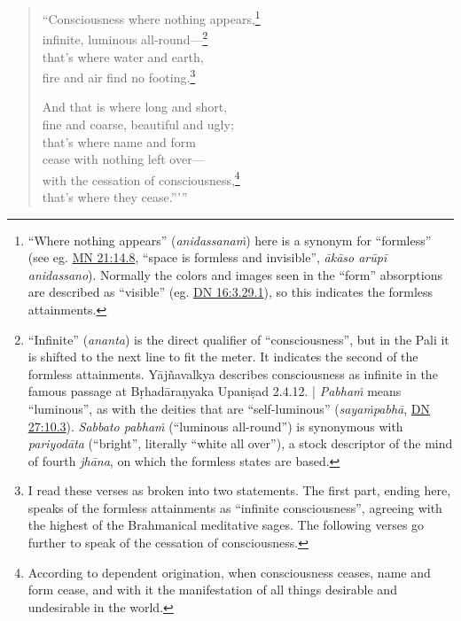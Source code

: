 \documentclass[12pt,openany]{book}%
\begin{document}
\begin{verse}%
“Consciousness where nothing appears,\footnote{“Where nothing appears” (\textit{\textsanskrit{anidassanaṁ}}) here is a synonym for “formless” (see eg. \href{https://suttacentral.net/mn21/en/sujato\#14.8}{MN 21:14.8}, “space is formless and invisible”, \textit{\textsanskrit{ākāso} \textsanskrit{arūpī} anidassano}). Normally the colors and images seen in the “form” absorptions are described as “visible” (eg. \href{https://suttacentral.net/dn16/en/sujato\#3.29.1}{DN 16:3.29.1}), so this indicates the formless attainments. } \\
infinite, luminous all-round—\footnote{“Infinite” (\textit{ananta}) is the direct qualifier of “consciousness”, but in the Pali it is shifted to the next line to fit the meter. It indicates the second of the formless attainments. \textsanskrit{Yājñavalkya} describes consciousness as infinite in the famous passage at \textsanskrit{Bṛhadāraṇyaka} \textsanskrit{Upaniṣad} 2.4.12. | \textit{\textsanskrit{Pabhaṁ}} means “luminous”, as with the deities that are “self-luminous” (\textit{\textsanskrit{sayaṁpabhā}}, \href{https://suttacentral.net/dn27/en/sujato\#10.3}{DN 27:10.3}). \textit{Sabbato \textsanskrit{pabhaṁ}} (“luminous all-round”) is synonymous with \textit{\textsanskrit{pariyodāta}} (“bright”, literally “white all over”), a stock descriptor of the mind of fourth \textit{\textsanskrit{jhāna}}, on which the formless states are based. } \\
that’s where water and earth, \\
fire and air find no footing.\footnote{I read these verses as broken into two statements. The first part, ending here, speaks of the formless attainments as “infinite consciousness”, agreeing with the highest of the Brahmanical meditative sages. The following verses go further to speak of the cessation of consciousness. } 

And that is where long and short, \\
fine and coarse, beautiful and ugly; \\
that’s where name and form \\
cease with nothing left over—\\
with the cessation of consciousness,\footnote{According to dependent origination, when consciousness ceases, name and form cease, and with it the manifestation of all things desirable and undesirable in the world. } \\
that’s where they cease.”’” 

%
\end{verse}
\end{document}
